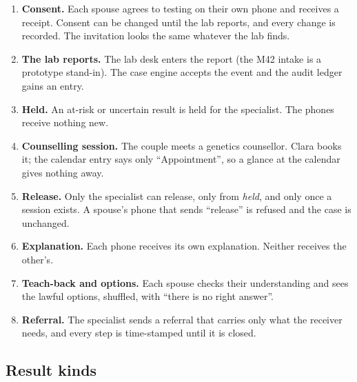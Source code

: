 \documentclass[10.5pt,a4paper]{article}
\begin{document}
\begin{enumerate}
  \item \textbf{Consent.} Each spouse agrees to testing on their own phone and receives a receipt. Consent can be
        changed until the lab reports, and every change is recorded. The invitation looks the same whatever the lab finds.
  \item \textbf{The lab reports.} The lab desk enters the report (the M42 intake is a prototype stand-in). The case engine accepts the
        event and the audit ledger gains an entry.
  \item \textbf{Held.} An at-risk or uncertain result is held for the specialist. The phones receive nothing new.
  \item \textbf{Counselling session.} The couple meets a genetics counsellor. Clara books it; the calendar entry says
        only ``Appointment'', so a glance at the calendar gives nothing away.
  \item \textbf{Release.} Only the specialist can release, only from \emph{held}, and only once a session exists. A
        spouse's phone that sends ``release'' is refused and the case is unchanged.
  \item \textbf{Explanation.} Each phone receives its own explanation. Neither receives the other's.
  \item \textbf{Teach-back and options.} Each spouse checks their understanding and sees the lawful options, shuffled,
        with ``there is no right answer''.
  \item \textbf{Referral.} The specialist sends a referral that carries only what the receiver needs, and every step is
        time-stamped until it is closed.
\end{enumerate}

\subsection{Result kinds}
\end{document}
